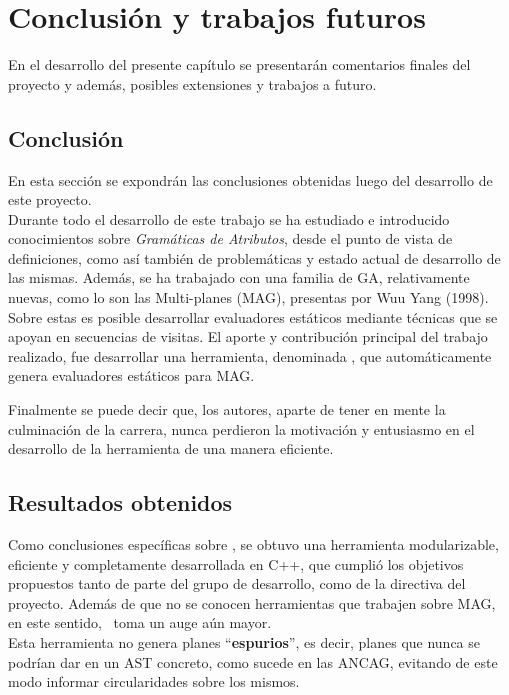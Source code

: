\chapter{Conclusión y trabajos futuros}
\label{chap:conclusiones}

\minitoc

En el desarrollo del presente capítulo se presentarán comentarios finales del proyecto y además, posibles extensiones y trabajos a futuro.

\section{Conclusión}

En esta sección se expondrán las conclusiones obtenidas luego del desarrollo de este proyecto.\\

Durante todo el desarrollo de este trabajo se ha estudiado e introducido conocimientos sobre \textit{Gramáticas de Atributos}, desde el punto de vista de definiciones, como así también de problemáticas y estado actual de desarrollo de las mismas. Además, se ha trabajado con una familia de GA, relativamente nuevas, como lo son las Multi-planes (MAG), presentas por Wuu Yang (1998). Sobre estas es posible desarrollar evaluadores estáticos mediante técnicas que se apoyan en secuencias de visitas. El aporte y contribución principal del trabajo realizado, fue desarrollar una herramienta, denominada \maggen, que automáticamente genera evaluadores estáticos para MAG.

Finalmente se puede decir que, los autores, aparte de tener en mente la culminación de la carrera, nunca perdieron la motivación y entusiasmo en el desarrollo de la herramienta de una manera eficiente.

\section{Resultados obtenidos}

Como conclusiones específicas sobre \maggen, se obtuvo una herramienta modularizable, eficiente y completamente desarrollada en C++, que cumplió los objetivos propuestos tanto de parte del grupo de desarrollo, como de la directiva del proyecto. Además de que no se conocen herramientas que trabajen sobre MAG, en este sentido, \maggen\ toma un auge aún mayor.\\

Esta herramienta no genera planes ``\textbf{espurios}'', es decir, planes que nunca se podrían dar en un AST concreto, como sucede en las ANCAG, evitando de este modo informar circularidades sobre los mismos.


